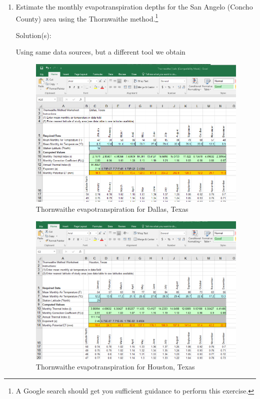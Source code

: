 \documentclass[12pt]{article}
\begin{document}
\begin{enumerate}
\clearpage
\item Estimate the monthly evapotranspiration depths for the San Angelo (Concho County) area using the Thornwaithe method.\footnote{A Google search should get you sufficient guidance to perform this exercise.}

Solution(s):

Using same data sources, but a different tool we obtain

\begin{figure}[h!] %
   \centering
   \includegraphics[width=6in]{thorndallas.png} 
   \caption{Thornwaithe evapotranspiration for Dallas, Texas}
   \label{fig:thorndallas}
\end{figure}

\begin{figure}[h!] %
   \centering
   \includegraphics[width=6in]{thornhouston.png} 
   \caption{Thornwaithe evapotranspiration for Houston, Texas}
   \label{fig:thornhouston}
\end{figure}


\end{enumerate}
\end{document}
